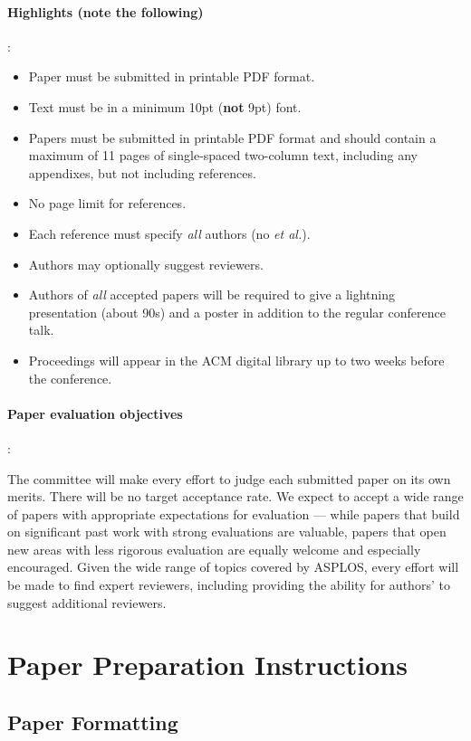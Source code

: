 \documentclass[pageno]{jpaper}
\begin{document}
\paragraph{Highlights ({\bf note the following})}:
\begin{itemize}
\item Paper must be submitted in printable PDF format.
\item Text must be in a minimum 10pt ({\bf not} 9pt) font.
\item Papers must be submitted in printable PDF format and should contain a
maximum of 11 pages of single-spaced two-column text, including any
appendixes, but not including references.
\item No page limit for references.
\item Each reference must specify {\em all} authors (no {\em et al.}).
\item Authors may optionally suggest reviewers.
\item Authors of {\em all} accepted papers will be required to give a
lightning presentation (about 90s) and a poster in addition to the regular
conference talk.
\item Proceedings will appear in the ACM digital library up to two weeks
before the conference.
\end{itemize}

\paragraph{Paper evaluation objectives}:

The committee will make every effort to judge each submitted paper on
its own merits. There will be no target acceptance rate.  We expect to
accept a wide range of papers with appropriate expectations for
evaluation --- while papers that build on significant past work with
strong evaluations are valuable, papers that open new areas with less
rigorous evaluation are equally welcome and especially encouraged.
Given the wide range of topics covered by ASPLOS, every effort will be
made to find expert reviewers, including providing the ability for
authors' to suggest additional reviewers.

\section{Paper Preparation Instructions}

\subsection{Paper Formatting}
\end{document}
